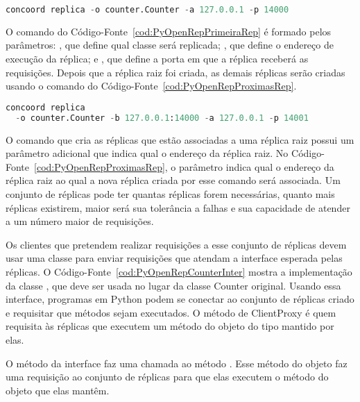 \begin{lstlisting}[language=Python, caption={Comando para iniciar a primeira réplica de um conjunto de réplicas}, label={cod:PyOpenRepPrimeiraRep}]
concoord replica -o counter.Counter -a 127.0.0.1 -p 14000
\end{lstlisting}

O comando do Código-Fonte~\ref{cod:PyOpenRepPrimeiraRep} é formado pelos parâmetros: , que define qual classe será replicada; , que define o endereço de execução da réplica; e , que define a porta em que a réplica receberá as requisições. Depois que a réplica raiz foi criada, as demais réplicas serão criadas usando o comando do Código-Fonte~\ref{cod:PyOpenRepProximasRep}.

\begin{lstlisting}[language=Python, caption={Comando para criar novas réplicas e associar a uma outra réplica raiz}, label={cod:PyOpenRepProximasRep}]
concoord replica 
  -o counter.Counter -b 127.0.0.1:14000 -a 127.0.0.1 -p 14001
\end{lstlisting}

O comando que cria as réplicas que estão associadas a uma réplica raiz possui um parâmetro adicional que indica qual o endereço da réplica raiz. No Código-Fonte~\ref{cod:PyOpenRepProximasRep}, o parâmetro  indica qual o endereço da réplica raiz ao qual a nova réplica criada por esse comando será associada. Um conjunto de réplicas pode ter quantas réplicas forem necessárias, quanto mais réplicas existirem, maior será sua tolerância a falhas e sua capacidade de atender a um número maior de requisições.

Os clientes que pretendem realizar requisições a esse conjunto de réplicas devem usar uma classe  para enviar requisições que atendam a interface esperada pelas réplicas. O Código-Fonte~\ref{cod:PyOpenRepCounterInter} mostra a implementação da classe , que deve ser usada no lugar da classe Counter original. Usando essa interface, programas em Python podem se conectar ao conjunto de réplicas criado e requisitar que métodos sejam executados. O método  de ClientProxy é quem requisita às réplicas que executem um método do objeto do tipo  mantido por elas.

O método  da interface faz uma chamada ao método . Esse método do objeto  faz uma requisição ao conjunto de réplicas para que elas executem o método  do objeto  que elas mantêm.

